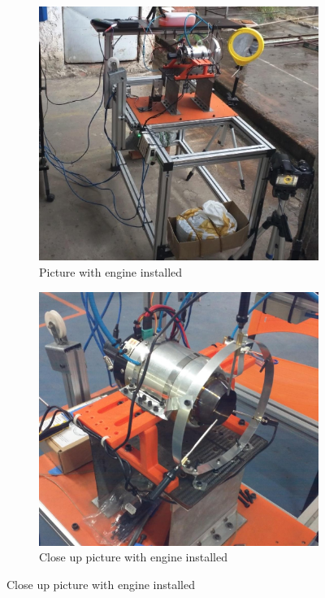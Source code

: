 \begin{figure}[p]
    \begin{subfigure}{.49\textwidth}
        \includegraphics[width=.9\textwidth]{fig/engine_in_bench3.jpg}
        \caption{Picture with engine installed}
        \label{fig:test_bench!picture}
    \end{subfigure}
    \begin{subfigure}{.49\textwidth}
        \includegraphics[width=.9\textwidth]{fig/engine_in_bench.jpg}
        \caption{Close up picture with engine installed}
        \label{fig:engine!closeup}
    \end{subfigure}
\end{figure}

